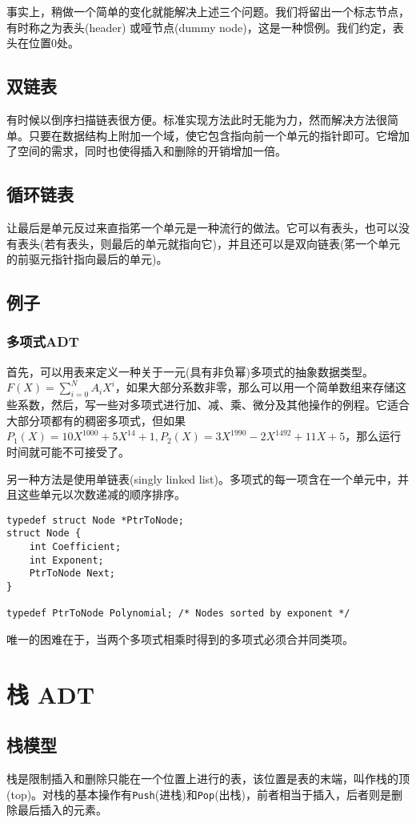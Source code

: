 \documentclass[utf8]{ctexbook}
\begin{document}
事实上，稍做一个简单的变化就能解决上述三个问题。我们将留出一个标志节点，有时称之为{\kaishu 表头(header)} 或{\kaishu 哑节点(dummy node)}，这是一种惯例。我们约定，表头在位置0处。
\subsection{双链表}
有时候以倒序扫描链表很方便。标准实现方法此时无能为力，然而解决方法很简单。只要在数据结构上附加一个域，使它包含指向前一个单元的指针即可。它增加了空间的需求，同时也使得插入和删除的开销增加一倍。
\subsection{循环链表}
让最后是单元反过来直指笫一个单元是一种流行的做法。它可以有表头，也可以没有表头(若有表头，则最后的单元就指向它)，并且还可以是双向链表(笫一个单元的前驱元指针指向最后的单元)。
\subsection{例子}
\subsubsection{多项式ADT}
首先，可以用表来定义一种关于一元(具有非负幂)多项式的抽象数据类型。$\displaystyle F(X) = \sum_{i=0}^{N} A_i X^i$，如果{\kaishu 大部分系数非零}，那么可以用一个简单数组来存储这些系数，然后，写一些对多项式进行加、减、乘、微分及其他操作的例程。它适合大部分项都有的稠密多项式，但如果$P_1(X) = 10 X^{1000} + 5 X^{14} +1, P_2(X) = 3X^{1990} - 2X^{1492} + 11X+5$，那么运行时间就可能不可接受了。

另一种方法是使用单链表(singly linked list)。多项式的每一项含在一个单元中，并且这些单元以次数递减的顺序排序。
\begin{lstlisting}
typedef struct Node *PtrToNode;
struct Node {
    int Coefficient;
    int Exponent;
    PtrToNode Next;
}

typedef PtrToNode Polynomial; /* Nodes sorted by exponent */
\end{lstlisting}

唯一的困难在于，当两个多项式相乘时得到的多项式必须合并同类项。
\section{栈 ADT}
\subsection{栈模型}
{\kaishu 栈}是限制插入和删除只能在一个位置上进行的表，该位置是表的末端，叫作栈的{\kaishu 顶}(top)。对栈的基本操作有\verb|Push|(进栈)和\verb|Pop|(出栈)，前者相当于插入，后者则是删除最后插入的元素。
\end{document}
